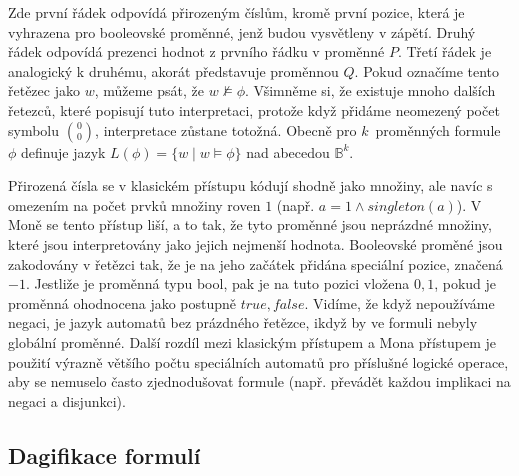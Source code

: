 Zde první řádek odpovídá přirozeným číslům, kromě první pozice, která je vyhrazena pro booleovské proměnné, jenž budou vysvětleny v zápětí. Druhý řádek odpovídá prezenci hodnot z prvního řádku v proměnné $P$. Třetí řádek je analogický k druhému, akorát představuje proměnnou $Q$. Pokud označíme tento řetězec jako $w$, můžeme psát, že $ w \nvDash \phi $. Všimněme si, že existuje mnoho dalších řetezců, které popisují tuto interpretaci, protože když přidáme neomezený počet symbolu $ \binom{0}{0} $, interpretace zůstane totožná. Obecně pro $k$~proměnných formule $\phi$ definuje jazyk $L(\phi)=\{ w \mid w \vDash \phi \} $ nad abecedou $ \mathbb{B}^k $. 

Přirozená čísla se v klasickém přístupu kódují shodně jako množiny, ale navíc s omezením na počet prvků množiny roven $1$ (např. $a = 1 \wedge singleton(a)$). V Moně se tento přístup liší, a to tak, že tyto proměnné jsou neprázdné množiny, které jsou interpretovány jako jejich nejmenší hodnota. Booleovské proměné jsou zakodovány v řetězci tak, že je na jeho začátek přidána speciální pozice, značená $-1$. Jestliže je proměnná typu bool, pak je na tuto pozici vložena $0,1$, pokud je proměnná ohodnocena jako postupně $true,false$. Vidíme, že když nepoužíváme negaci, je jazyk automatů bez prázdného řetězce, ikdyž by ve formuli nebyly globální proměnné. Další rozdíl mezi klasickým přístupem a Mona přístupem je použití výrazně většího počtu speciálních automatů pro příslušné logické operace, aby se nemuselo často zjednodušovat formule (např. převádět každou implikaci na negaci a disjunkci). 

\subsection{Dagifikace formulí}

